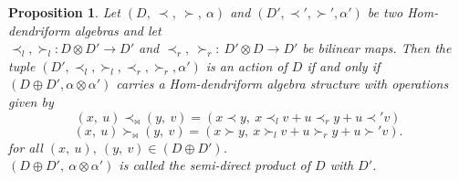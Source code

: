 \documentclass[11pt,twoside,reqno]{amsart}
\theoremstyle{plain}
\newtheorem{proposition}[thm]{Proposition}
\theoremstyle{definition}
\begin{document}
\begin{proposition}
 Let $(D ,\ \prec,\  \succ ,\ \alpha)$ and $(D',\prec',\succ', \alpha')$ be two Hom-dendriform algebras and let \\$\prec_l,\succ_l: D \otimes D' \to D'$ and $\prec_r ,\ \succ_r :\ D' \otimes D \to D'$ be bilinear maps. Then  the tuple $(D', \prec_l, \succ_l, \prec_r,\succ_r, \alpha')$ is an action of $D$ if and only if $(D \oplus D', \alpha\otimes \alpha')$ carries a Hom-dendriform algebra structure with operations given by
 \[
(x,\  u) \mathbin{\prec_{\bowtie}} (y,\  v)  = \left(x \prec y,\  x \prec_l v + u \prec_r y + u \prec' v\right)  
\]
\[
(x,\  u) \mathbin{\succ_{\bowtie}} (y,\  v)  = \left(x \succ y,\  x \succ_l v + u \succ_r y + u \succ' v\right).
\]
for all $(x,\  u),\ (y ,\  v) \in (D \oplus D')$.\\ $(D \oplus D'  ,\ \alpha\otimes \alpha')$ is called the semi-direct product of $D$ with $D'$.\\
\end{proposition}
\end{document}
